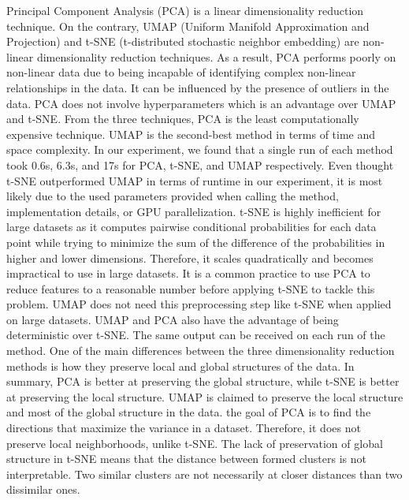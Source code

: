 \documentclass[12pt, letterpaper]{article}
\begin{document}
Principal Component Analysis (PCA) is a linear dimensionality reduction technique. On the contrary, UMAP (Uniform Manifold Approximation and Projection) and t-SNE (t-distributed stochastic neighbor embedding) are non-linear dimensionality reduction techniques. As a result, PCA performs poorly on non-linear data due to being incapable of identifying complex non-linear relationships in the data. It can be influenced by the presence of outliers in the data. PCA does not involve hyperparameters which is an advantage over UMAP and t-SNE. From the three techniques, PCA is the least computationally expensive technique. UMAP is the second-best method in terms of time and space complexity. In our experiment, we found that a single run of each method took 0.6s, 6.3s, and 17s for PCA, t-SNE, and UMAP respectively. Even thought t-SNE outperformed UMAP in terms of runtime in our experiment, it is most likely due to the used parameters provided when calling the method, implementation details, or GPU parallelization. t-SNE is highly inefficient for large datasets as it computes pairwise conditional probabilities for each data point while trying to minimize the sum of the difference of the probabilities in higher and lower dimensions. Therefore, it scales quadratically and becomes impractical to use in large datasets. It is a common practice to use PCA to reduce features to a reasonable number before applying t-SNE to tackle this problem. UMAP does not need this preprocessing step like t-SNE when applied on large datasets. UMAP and PCA also have the advantage of being deterministic over t-SNE. The same output can be received on each run of the method. One of the main differences between the three dimensionality reduction methods is how they preserve local and global structures of the data. In summary, PCA is better at preserving the global structure, while t-SNE is better at preserving the local structure. UMAP is claimed to preserve the local structure and most of the global structure in the data. the goal of PCA is to find the directions that maximize the variance in a dataset. Therefore, it does not preserve local neighborhoods, unlike t-SNE. The lack of preservation of global structure in t-SNE means that the distance between formed clusters is not interpretable. Two similar clusters are not necessarily at closer distances than two dissimilar ones.
\\
\end{document}

